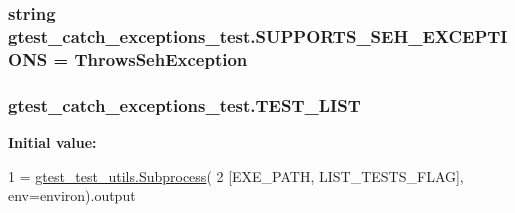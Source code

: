 \subsubsection[{\texorpdfstring{S\+U\+P\+P\+O\+R\+T\+S\+\_\+\+S\+E\+H\+\_\+\+E\+X\+C\+E\+P\+T\+I\+O\+NS}{SUPPORTS_SEH_EXCEPTIONS}}]{\setlength{\rightskip}{0pt plus 5cm}string gtest\+\_\+catch\+\_\+exceptions\+\_\+test.\+S\+U\+P\+P\+O\+R\+T\+S\+\_\+\+S\+E\+H\+\_\+\+E\+X\+C\+E\+P\+T\+I\+O\+NS = \textquotesingle{}Throws\+Seh\+Exception\textquotesingle{}}\hypertarget{namespacegtest__catch__exceptions__test_a237f68d721da53e9fd4f83b07a1887e3}{}\label{namespacegtest__catch__exceptions__test_a237f68d721da53e9fd4f83b07a1887e3}
\subsubsection[{\texorpdfstring{T\+E\+S\+T\+\_\+\+L\+I\+ST}{TEST_LIST}}]{\setlength{\rightskip}{0pt plus 5cm}gtest\+\_\+catch\+\_\+exceptions\+\_\+test.\+T\+E\+S\+T\+\_\+\+L\+I\+ST}\hypertarget{namespacegtest__catch__exceptions__test_ac0cf90f54624335d1765e85cf6a74e21}{}\label{namespacegtest__catch__exceptions__test_ac0cf90f54624335d1765e85cf6a74e21}
{\bfseries Initial value\+:}
\begin{DoxyCode}
1 = \hyperlink{classgtest__test__utils_1_1_subprocess}{gtest\_test\_utils.Subprocess}(
2     [EXE\_PATH, LIST\_TESTS\_FLAG], env=environ).output
\end{DoxyCode}
